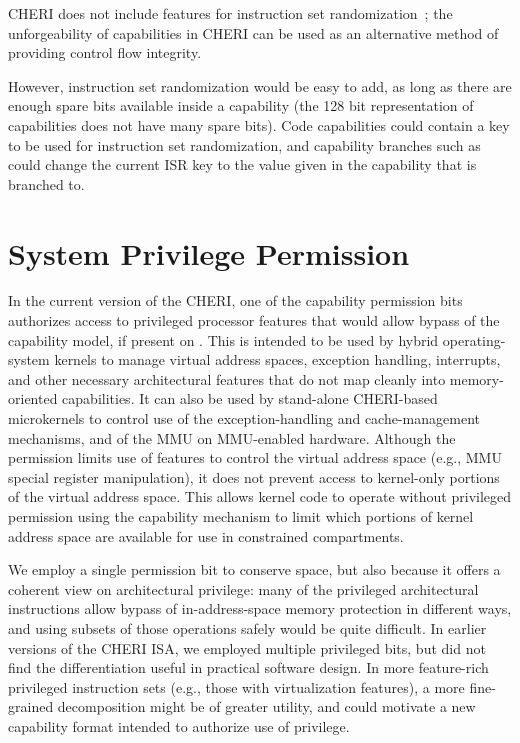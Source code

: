 CHERI does not include features for instruction set
randomization~\cite{Keromytis2003};
the unforgeability of capabilities in CHERI can be used as an alternative
method of providing control flow integrity.

However, instruction set randomization would be easy to add, as long as
there are enough spare bits available inside a capability (the 128 bit
representation of capabilities does not have many spare bits). Code
capabilities could contain a key to be used for instruction set
randomization, and capability branches such as  could
change the current ISR key to the value given in the capability that is
branched to.

\section{System Privilege Permission}

In the current version of the CHERI, one of the capability permission bits
authorizes access to privileged processor features that would allow
bypass of the capability model, if present on \PCC{}.
This is intended to be used by hybrid operating-system kernels to manage
virtual address spaces, exception handling, interrupts, and other necessary
architectural features that do not map cleanly into memory-oriented
capabilities.
It can also be used by stand-alone CHERI-based microkernels to control use
of the exception-handling and cache-management mechanisms, and of the MMU on
MMU-enabled hardware.
Although the permission limits use of features to control the virtual address
space (e.g., MMU special register manipulation), it does not prevent access to kernel-only
portions of the virtual address space.
This allows kernel code to operate without privileged permission using the
capability mechanism to limit which portions of kernel address space are
available for use in constrained compartments.

We employ a single permission bit to conserve space,
but also because it offers a coherent view on architectural
privilege: many of the privileged architectural instructions allow bypass of
in-address-space memory protection in different ways, and using subsets of
those operations safely would be quite difficult.
In earlier versions of the CHERI ISA, we employed multiple privileged bits,
but did not find the differentiation useful in practical software design.
In more feature-rich privileged instruction sets (e.g., those with
virtualization features), a more fine-grained decomposition might be of
greater utility, and could motivate a new capability format intended to
authorize use of privilege.

